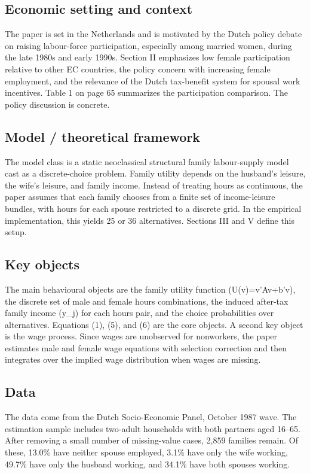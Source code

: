 \documentclass[11pt,a4paper]{article}
\begin{document}
\subsection*{Economic setting and context}
The paper is set in the Netherlands and is motivated by the Dutch policy debate on raising labour-force participation, especially among married women, during the late 1980s and early 1990s. Section II emphasizes low female participation relative to other EC countries, the policy concern with increasing female employment, and the relevance of the Dutch tax-benefit system for spousal work incentives. Table 1 on page 65 summarizes the participation comparison. The policy discussion is concrete.

\subsection*{Model / theoretical framework}
The model class is a static neoclassical structural family labour-supply model cast as a discrete-choice problem. Family utility depends on the husband’s leisure, the wife’s leisure, and family income. Instead of treating hours as continuous, the paper assumes that each family chooses from a finite set of income-leisure bundles, with hours for each spouse restricted to a discrete grid. In the empirical implementation, this yields 25 or 36 alternatives. Sections III and V define this setup.

\subsection*{Key objects}
The main behavioural objects are the family utility function (U(v)=v'Av+b'v), the discrete set of male and female hours combinations, the induced after-tax family income (y\_j) for each hours pair, and the choice probabilities over alternatives. Equations (1), (5), and (6) are the core objects. A second key object is the wage process. Since wages are unobserved for nonworkers, the paper estimates male and female wage equations with selection correction and then integrates over the implied wage distribution when wages are missing.

\subsection*{Data}
The data come from the Dutch Socio-Economic Panel, October 1987 wave. The estimation sample includes two-adult households with both partners aged 16–65. After removing a small number of missing-value cases, 2,859 families remain. Of these, 13.0\% have neither spouse employed, 3.1\% have only the wife working, 49.7\% have only the husband working, and 34.1\% have both spouses working.
\end{document}
